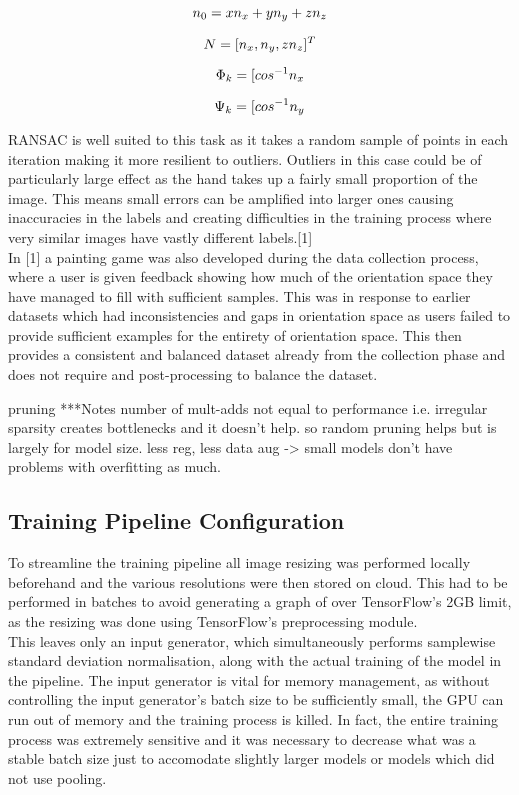 \documentclass{article}
\begin{document}
\[\emph{$n_{0}$} =  \emph{$xn_{x}$} + \emph{$yn_{y}$} + \emph{$zn_{z}$}\]

\[\emph{$N$} =  [\emph{$n_{x}$}, \emph{$n_{y}$}, \emph{$zn_{z}$}]^T\]

\[\emph{$\Phi_{k}$} =  [\emph{$cos^{-1}n_{x}$}\]

\[\emph{$\Psi_{k}$} =  [\emph{$cos^{-1}n_{y}$}\]

RANSAC is well suited to this task as it takes a random sample of points in each iteration making it more resilient to outliers. Outliers in this case could be of particularly large effect as the hand takes up a fairly small proportion of the image. This means small errors can be amplified into larger ones causing inaccuracies in the labels and creating difficulties in the training process where very similar images have vastly different labels.[1]\\

In [1] a painting game was also developed during the data collection process, where a user is given feedback showing how much of the orientation space they have managed to fill with sufficient samples. This was in response to earlier datasets which had inconsistencies and gaps in orientation space as users failed to provide sufficient examples for the entirety of orientation space. This then provides a consistent and balanced dataset already from the collection phase and does not require and post-processing to balance the dataset.


 pruning
***Notes
number of mult-adds not equal to performance i.e. irregular sparsity creates bottlenecks and it doesn't help. so random pruning helps but is largely for model size. less reg, less data aug -> small models don't have problems with overfitting as much.

\subsection*{Training Pipeline Configuration}
To streamline the training pipeline all image resizing was performed locally beforehand and the various resolutions were then stored on cloud. This had to be performed in batches to avoid generating a graph of over TensorFlow's 2GB limit, as the resizing was done using TensorFlow's preprocessing module. \\

This leaves only an input generator, which simultaneously performs samplewise standard deviation normalisation, along with the actual training of the model in the pipeline.
The input generator is vital for memory management, as without controlling the input generator's batch size to be sufficiently small, the GPU can run out of memory and the training process is killed. In fact, the entire training process was extremely sensitive and it was necessary to decrease what was a stable batch size just to accomodate slightly larger models or models which did not use pooling. \\
\end{document}

